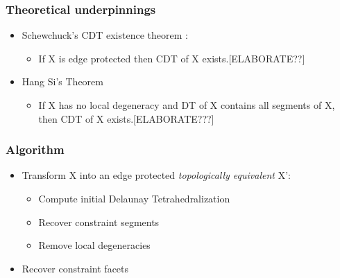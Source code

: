 \documentclass{beamer}
\begin{document}
	\begin{frame}
		\frametitle{Theoretical underpinnings}
			\begin{itemize}
				\item	Schewchuck's CDT existence theorem \cite{schewCDTExistence}:
					\begin{itemize}
						\item If X is edge protected then CDT of X exists.[ELABORATE??]	
					\end{itemize}		
				\item	Hang Si's Theorem \cite{hangSiMeshingPLCByCDT}
					\begin{itemize}
						\item If X has no local degeneracy and DT of X contains all segments of X, then CDT of X exists.[ELABORATE???] 
					\end{itemize}		
			\end{itemize}		
	\end{frame}	
	\begin{frame}
		\frametitle{Algorithm} 
			\begin{itemize}
				\item Transform X into an edge protected \textit{topologically equivalent} X':	
				\begin{itemize}
					\item Compute initial Delaunay Tetrahedralization	
					\item Recover constraint segments
					\item Remove local degeneracies
				\end{itemize}
				\item Recover constraint facets
			\end{itemize}		
	\end{frame}
\end{document}
